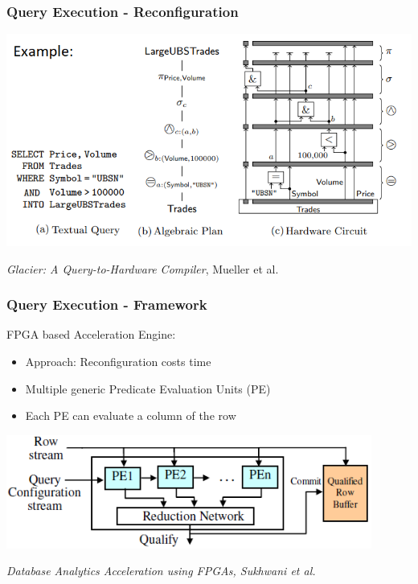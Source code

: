 \documentclass{beamer}
\begin{document}
\begin{frame}
\frametitle{Query Execution - Reconfiguration}
\begin{center}
	\includegraphics[width=1.0\textwidth]{img/glacier.png}
\end{center}
\begin{center}
	\small \emph{Glacier: A Query-to-Hardware Compiler}, Mueller et al.
\end{center}

\end{frame}

\begin{frame}
	\frametitle{Query Execution - Framework}
	FPGA based Acceleration Engine:
	\begin{itemize}
		\item Approach: Reconfiguration costs time
		\item Multiple generic Predicate Evaluation Units (PE)
		\item Each PE can evaluate a column of the row
	\end{itemize}
	\vspace*{0.2cm}
	\includegraphics[width=0.9\textwidth]{img/row_stream.PNG}
	\vspace*{0.1cm}
	\begin{center}
		\small \emph{Database Analytics Acceleration using FPGAs, Sukhwani et al.}
	\end{center}
\end{frame}
\end{document}
